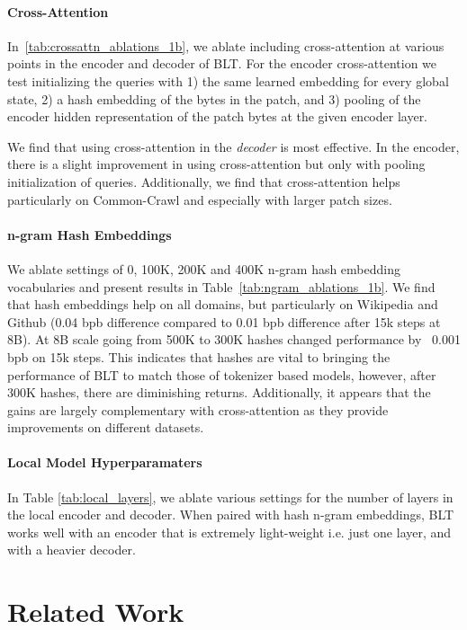 \paragraph{Cross-Attention} 
In~\autoref{tab:crossattn_ablations_1b}, we ablate including cross-attention at various points in the encoder and decoder of {\textsc BLT}. For the encoder cross-attention we test initializing the queries with 1) the same learned embedding for every global state, 2) a hash embedding of the bytes in the patch, and 3) pooling of the encoder hidden representation of the patch bytes at the given encoder layer.

We find that using cross-attention in the \textit{decoder} is most effective. In the encoder, there is a slight improvement in using cross-attention but only with pooling initialization of queries. Additionally, we find that cross-attention helps particularly on Common-Crawl and especially with larger patch sizes.

\paragraph{n-gram Hash Embeddings} 

We ablate settings of 0, 100K, 200K and 400K n-gram hash embedding vocabularies and present results in Table~\ref{tab:ngram_ablations_1b}. We find that hash embeddings help on all domains, but particularly on Wikipedia and Github (0.04 bpb difference compared to 0.01 bpb difference after 15k steps at 8B). At 8B scale going from 500K to 300K hashes changed performance by ~0.001 bpb on 15k steps. This indicates that hashes are vital to bringing the performance of {\textsc BLT} to match those of tokenizer based models, however, after 300K hashes, there are diminishing returns. Additionally, it appears that the gains are largely complementary with cross-attention as they provide improvements on different datasets.

\paragraph{Local Model Hyperparamaters} In Table \ref{tab:local_layers}, we ablate various settings for the number of layers in the local encoder and decoder. When paired with hash n-gram embeddings, {\textsc BLT} works well with an encoder that is extremely light-weight i.e. just one layer, and with a heavier decoder.

\section{Related Work}
\label{section:related_work}

